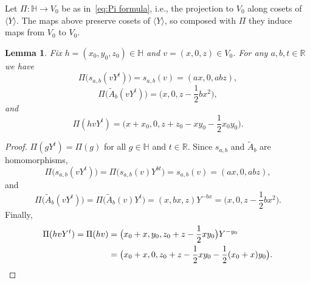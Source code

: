 \documentclass[11pt,reqno]{amsart}
\renewcommand{\H}{\mathbb{H}}
\newcommand{\R}{\mathbb{R}}
\newcommand{\0}{\mathbf{0}}
\renewcommand{\1}{\mathbf 1}
\newcommand{\from}{\colon}
\newtheorem{lemma}[thm]{Lemma}
\theoremstyle{remark}
\begin{document}
Let $\Pi\from \H \to V_0$ be as in~\eqref{eq:Pi formula}, i.e., the projection to $V_0$ along cosets of $\langle Y\rangle$. The maps above preserve cosets of $\langle Y\rangle$, so composed with $\Pi$ they induce maps from $V_0$ to $V_0$.
\begin{lemma}\label{lem:v0 transforms}
Fix $h=(x_0,y_0,z_0)\in \H$ and $v=(x,0,z) \in V_0$. For any $a,b,t\in \R$ we have
  $$\Pi\big(s_{a,b}(v Y^t)\big)=s_{a,b}(v)=(ax,0,abz),$$
  $$\Pi\big(\tilde{A}_{b}(vY^t)\big)=\big(x,0,z-\frac12 bx^2\big),$$
  and
  $$\Pi(h vY^t)=\big(x+x_0, 0, z+z_0-xy_0-\frac12x_0y_0\big).$$
\end{lemma}
\begin{proof}
  $\Pi(gY^t)=\Pi(g)$ for all $g\in \H$ and $t\in \R$.  Since $s_{a,b}$ and $\tilde{A}_b$ are homomorphisms,
  $$\Pi\big(s_{a,b}(v  Y^t)\big)=\Pi\big(s_{a,b}(v) Y^{bt}\big)=s_{a,b}(v)=(ax,0,abz),$$
  and
  $$\Pi\big(\tilde{A}_b(v Y^t)\big)=\Pi\big(\tilde{A}_b(v) Y^{t}\big)=(x,bx,z)Y^{-bx}=\big(x,0,z-\frac12bx^2\big).$$
  Finally,
  \begin{align*}\Pi(h v Y^t)=\Pi(h v)&=\big(x_0+x,y_0,z_0+z-\frac12xy_0\big)Y^{-y_0}\\&=\big(x_0+x,0,z_0+z-\frac12xy_0-\frac12(x_0+x)y_0\big).\qedhere
  \end{align*}
\end{proof}
\end{document}
